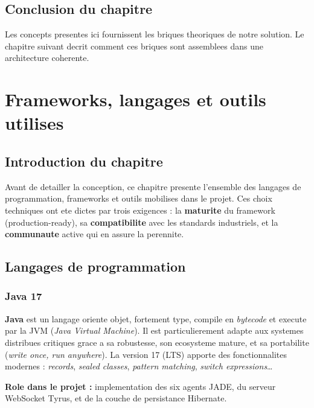 \documentclass[12pt,a4paper,oneside]{report}
\begin{document}
\section{Conclusion du chapitre}
Les concepts presentes ici fournissent les briques theoriques de notre
solution. Le chapitre suivant decrit comment ces briques sont assemblees dans
une architecture coherente.

\chapter{Frameworks, langages et outils utilises}

\section{Introduction du chapitre}
Avant de detailler la conception, ce chapitre presente l'ensemble des
langages de programmation, frameworks et outils mobilises dans le projet. Ces
choix techniques ont ete dictes par trois exigences : la \textbf{maturite} du
framework (production-ready), sa \textbf{compatibilite} avec les standards
industriels, et la \textbf{communaute} active qui en assure la perennite.

\section{Langages de programmation}

\subsection{Java 17}

\textbf{Java} est un langage oriente objet, fortement type, compile en
\emph{bytecode} et execute par la JVM (\emph{Java Virtual Machine}). Il est
particulierement adapte aux systemes distribues critiques grace a sa
robustesse, son ecosysteme mature, et sa portabilite (\emph{write once, run
anywhere}). La version 17 (LTS) apporte des fonctionnalites modernes :
\emph{records}, \emph{sealed classes}, \emph{pattern matching},
\emph{switch expressions}\dots

\textbf{Role dans le projet :} implementation des six agents JADE, du serveur
WebSocket Tyrus, et de la couche de persistance Hibernate.
\end{document}
